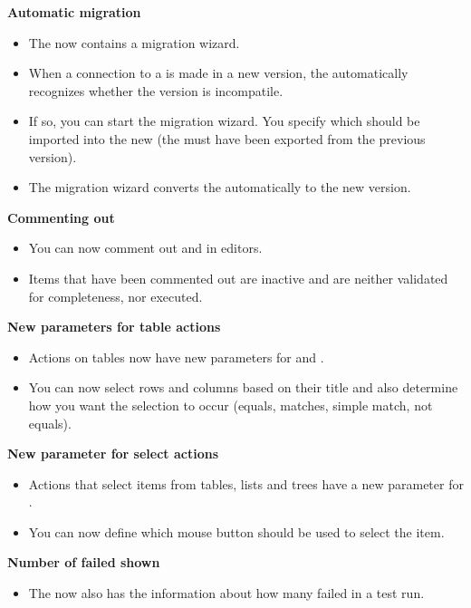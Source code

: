 \textbf{Automatic \gddb{} migration}
\begin{itemize}
\item The \ite{} now contains a \gddb{} migration wizard.
\item When a connection to a \gddb{} is made in a new version, the \ite{} automatically recognizes whether the \gddb{} version is incompatile. 
\item If so, you can start the migration wizard. You specify which \gdprojects{} should be imported into the new \gddb{} (the \gdprojects must have been exported from the previous version).
\item The migration wizard converts the \gddb{} automatically to the new version.
\end{itemize}

\textbf{Commenting out \gdcases{}}
\begin{itemize}
\item You can now comment out \gdcases{} and \gdsteps{} in editors. 
\item Items that have been commented out are inactive and are neither validated for \gdsuite{} completeness, nor executed.
\end{itemize}

\textbf{New parameters for table actions}
\begin{itemize}
\item Actions on tables now have new parameters for  and .
\item You can now select rows and columns based on their title and also determine how you want the selection to occur (equals, matches, simple match, not equals).
\end{itemize}

\textbf{New parameter for select actions}
\begin{itemize}
\item Actions that select items from tables, lists and trees have a new parameter for .
\item You can now define which mouse button should be used to select the item.
\end{itemize}

\textbf{Number of failed \gdsteps{} shown}
\begin{itemize}
\item The \gdtestsummaryview{} now also has the information about how many \gdsteps{} failed in a test run.
\end{itemize}

